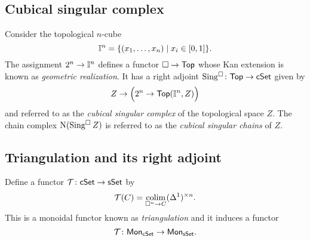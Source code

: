 \subsection{Cubical singular complex}

Consider the topological $n$-cube
\begin{equation*}
\mathbb{I}^{n} = \{(x_1, \dots, x_n) \mid x_i \in [0,1]\}.
\end{equation*}
The assignment $2^n \to \mathbb{I}^n$ defines a functor $\square \to \mathsf{Top}$ whose Kan extension is known as \textit{geometric realization}.
It has a right adjoint $\operatorname{Sing^{\square}} \colon \mathsf{Top} \to \mathsf{cSet}$ given by
\begin{equation*}
Z \to \Big(2^n \to \mathsf{Top}(\mathbb{I}^n, Z)\Big)
\end{equation*}
and referred to as the \textit{cubical singular complex} of the topological space $Z$.
The chain complex $\operatorname{N}(\operatorname{Sing^{\square}} Z)$ is referred to as the \textit{cubical singular chains} of $Z$.

\subsection{Triangulation and its right adjoint} \label{ss:triangulation and its adjoint}


Define a functor $\mathcal{T} \colon \mathsf{cSet} \to \mathsf{sSet}$ by $$\mathcal{T}(C) = \operatorname*{colim}_{\square^n \to C} (\Delta^1)^{\times n}.$$
This is a monoidal functor known as \textit{triangulation} and it induces a functor $$\mathcal{T} \colon \mathsf{Mon}_{\mathsf{cSet}} \to \mathsf{Mon}_{\mathsf{sSet}}.$$


